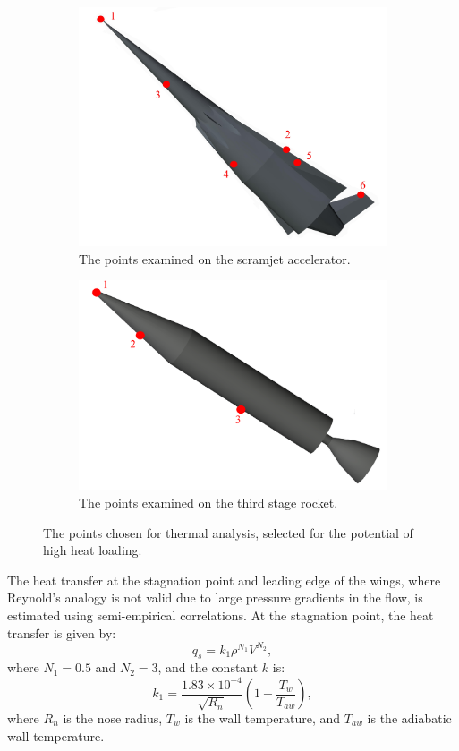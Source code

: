 \begin{figure}[!ht]
	
\begin{subfigure}{.5\textwidth}
	\centering
\includegraphics[width=0.9\linewidth]{figures/A1_uncertainty-analysis/Q_pos}
\caption{The points examined on the scramjet accelerator.}
\end{subfigure}
\begin{subfigure}{.5\textwidth}
	\centering
\includegraphics[width=0.9\linewidth]{figures/A1_uncertainty-analysis/Q_pos3}
\caption{The points examined on the third stage rocket.}
\end{subfigure}
\caption{The points chosen for thermal analysis, selected for the potential of high heat loading.}
\label{fig:Q_pos}
\end{figure}

The heat transfer at the stagnation point and leading edge of the wings, where Reynold's analogy is not valid due to large pressure gradients in the flow\cite{HypersonicGas}, is estimated using semi-empirical correlations\cite{Dirkx}. At the stagnation point, the heat transfer is given by\cite{Dirkx}:
\begin{equation}
q_s = k_1\rho^{N_1}V^{N_2},
\end{equation}
where $N_1 = 0.5$ and $N_2 = 3$, and the constant $k$ is\cite{Dirkx}:
\begin{equation}
k_1 = \frac{1.83 \times 10^{-4}}{\sqrt{R_n}}(1-\frac{T_w}{T_{aw}}),
\end{equation}
where $R_n$ is the nose radius, $T_w$ is the wall temperature, and $T_{aw}$ is the adiabatic wall temperature.

